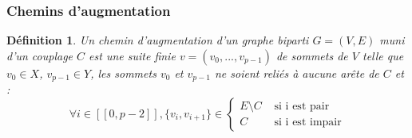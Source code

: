 \documentclass[11pt,a4paper]{article}
\newtheorem*{definition}{Définition}
\begin{document}
      \subsubsection{Chemins d'augmentation}

\begin{definition}
  Un chemin d'augmentation d'un graphe biparti \(G=(V,E)\) muni d'un couplage \(C\) est une suite finie \(v = (v_0, ..., v_{p-1})\) de sommets de \(V\) telle que \(v_0 \in X\), \(v_{p-1} \in Y\), les sommets \(v_0\) et \(v_{p-1}\) ne soient reliés à aucune arête de \(C\) et :
  \[
    \forall i \in [\![0,p-2]\!], \{v_i,v_{i+1}\} \in
      \left\{
        \begin{array}{ll}
          E \setminus C & \text{ si i est pair} \\
          C & \text{ si i est impair}
        \end{array}
      \right.
  \]
\end{definition}
\end{document}
